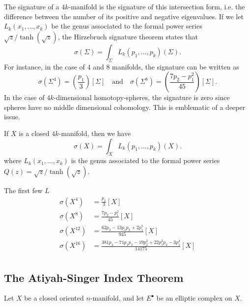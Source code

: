 The signature of a $4k$-manifold is the signature of this intersection form, i.e. the difference between the number of its positive and negative eigenvalues. If we let $L_k(x_1,\ldots, x_k)$ be the genus associated to the formal power series $\sqrt{z}/\tanh(\sqrt{z})$, the Hirzebruch signature theorem states that
\[
	\sigma(\Sigma) = \int_\Sigma L_k(p_1,\ldots, p_k)(\Sigma).
\]
For instance, in the case of $4$ and $8$ manifolds, the signature can be written as
\[
	\sigma(\Sigma^4) = \left(\frac{p_1}{3}\right)[\Sigma]
	\quad\textrm{and}\quad
	\sigma(\Sigma^8) = \left(\frac{7p_2 - p_1^2}{45}\right)[\Sigma].
\]
In the case of $4k$-dimensional homotopy-spheres, the signature is zero since spheres have no middle dimensional cohomology. This is emblematic of a deeper issue.

\begin{theorem}
	If $X$ is a closed $4k$-manifold, then we have
	\[
		\sigma(X) 
	 = \int_X L_k(p_1,\ldots, p_k)(X).
	\]
	where $L_k(x_1,\ldots,x_k)$ is the genus associated to the formal power series $Q(z) = \sqrt{z}/\tanh(\sqrt{z})$.
\end{theorem}

\begin{example}
	The first few $L$
	\[
		\begin{aligned}
			\sigma(X^4) &= \frac{p_1}{3}[X]\\
			\sigma(X^8) &= \frac{7p_2-p_1^2}{45}[X]\\
			\sigma(X^{12}) &= \frac{62p_3-13p_1p_2+2p_1^3}{945}[X]\\
			\sigma(X^{16}) &= \frac{381p_4 - 71p_1p_3 - 19p_2^2 + 22p_1^2p_2 - 3p_1^4}{14175}[X]\\
		\end{aligned}
	\]
\end{example}


\subsection*{The Atiyah-Singer Index Theorem}

\begin{theorem}\label{thm:atiyah-singer-index}
  Let $X$ be a closed oriented $n$-manifold, and let $E^\bullet$ be an elliptic complex on $X$.
\end{theorem}
